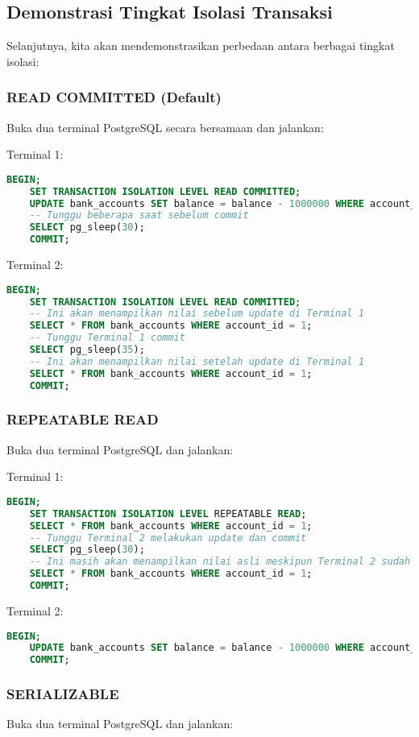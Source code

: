 \subsection{Demonstrasi Tingkat Isolasi Transaksi}
Selanjutnya, kita akan mendemonstrasikan perbedaan antara berbagai tingkat isolasi:

\subsubsection{READ COMMITTED (Default)}
Buka dua terminal PostgreSQL secara bersamaan dan jalankan:

Terminal 1:
\begin{lstlisting}[language=SQL]
	BEGIN;
	SET TRANSACTION ISOLATION LEVEL READ COMMITTED;
	UPDATE bank_accounts SET balance = balance - 1000000 WHERE account_id = 1;
	-- Tunggu beberapa saat sebelum commit
	SELECT pg_sleep(30);
	COMMIT;
\end{lstlisting}

Terminal 2:
\begin{lstlisting}[language=SQL]
	BEGIN;
	SET TRANSACTION ISOLATION LEVEL READ COMMITTED;
	-- Ini akan menampilkan nilai sebelum update di Terminal 1
	SELECT * FROM bank_accounts WHERE account_id = 1;
	-- Tunggu Terminal 1 commit
	SELECT pg_sleep(35);
	-- Ini akan menampilkan nilai setelah update di Terminal 1
	SELECT * FROM bank_accounts WHERE account_id = 1;
	COMMIT;
\end{lstlisting}

\subsubsection{REPEATABLE READ}
Buka dua terminal PostgreSQL dan jalankan:

Terminal 1:
\begin{lstlisting}[language=SQL]
	BEGIN;
	SET TRANSACTION ISOLATION LEVEL REPEATABLE READ;
	SELECT * FROM bank_accounts WHERE account_id = 1;
	-- Tunggu Terminal 2 melakukan update dan commit
	SELECT pg_sleep(30);
	-- Ini masih akan menampilkan nilai asli meskipun Terminal 2 sudah commit
	SELECT * FROM bank_accounts WHERE account_id = 1;
	COMMIT;
\end{lstlisting}

Terminal 2:
\begin{lstlisting}[language=SQL]
	BEGIN;
	UPDATE bank_accounts SET balance = balance - 1000000 WHERE account_id = 1;
	COMMIT;
\end{lstlisting}

\subsubsection{SERIALIZABLE}
Buka dua terminal PostgreSQL dan jalankan:


